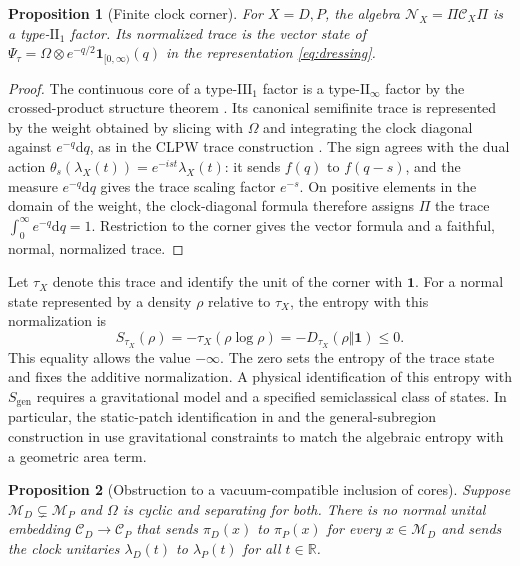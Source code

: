 \documentclass[11pt,a4paper]{article}
\numberwithin{equation}{section}
\newtheorem{proposition}{Proposition}[section]
\theoremstyle{remark}
\newcommand{\M}{\mathcal M}
\newcommand{\N}{\mathcal N}
\newcommand{\R}{\mathbb R}
\newcommand{\Core}{\mathcal C}
\newcommand{\dd}{\mathrm d}
\newcommand{\Sgen}{S_{\mathrm{gen}}}
\newcommand{\one}{\mathbf 1}
\begin{document}
\begin{proposition}[Finite clock corner]
\label{prop:corner}
For $X=D,P$, the algebra $\N_X=\Pi\Core_X\Pi$ is a type-$\mathrm{II}_1$ factor. Its normalized trace is the vector state of
$\Psi_\tau=\Omega\otimes e^{-q/2}\one_{[0,\infty)}(q)$ in the representation \eqref{eq:dressing}.
\end{proposition}

\begin{proof}
The continuous core of a type-$\mathrm{III}_1$ factor is a type-$\mathrm{II}_\infty$ factor by the crossed-product structure theorem \cite{Takesaki2003}. Its canonical semifinite trace is represented by the weight obtained by slicing with $\Omega$ and integrating the clock diagonal against $e^{-q}\dd q$, as in the CLPW trace construction \cite[Sec.~2.4]{CLPW2022}. The sign agrees with the dual action $\theta_s(\lambda_X(t))=e^{-ist}\lambda_X(t)$: it sends $f(q)$ to $f(q-s)$, and the measure $e^{-q}\dd q$ gives the trace scaling factor $e^{-s}$. On positive elements in the domain of the weight, the clock-diagonal formula therefore assigns $\Pi$ the trace $\int_0^\infty e^{-q}\dd q=1$. Restriction to the corner gives the vector formula and a faithful, normal, normalized trace.
\end{proof}

Let $\tau_X$ denote this trace and identify the unit of the corner with $\one$. For a normal state represented by a density $\rho$ relative to $\tau_X$, the entropy with this normalization is
\begin{equation}
 S_{\tau_X}(\rho)=-\tau_X(\rho\log\rho)
                  =-D_{\tau_X}(\rho\Vert\one)\leq0.
 \label{eq:trace-entropy}
\end{equation}
This equality allows the value $-\infty$. The zero sets the entropy of the trace state and fixes the additive normalization. A physical identification of this entropy with $\Sgen$ requires a gravitational model and a specified semiclassical class of states. In particular, the static-patch identification in \cite{CLPW2022} and the general-subregion construction in \cite{Jensen2023} use gravitational constraints to match the algebraic entropy with a geometric area term.

\begin{proposition}[Obstruction to a vacuum-compatible inclusion of cores]
\label{prop:obstruction}
Suppose $\M_D\subsetneq\M_P$ and $\Omega$ is cyclic and separating for both. There is no normal unital embedding $\Core_D\to\Core_P$ that sends $\pi_D(x)$ to $\pi_P(x)$ for every $x\in\M_D$ and sends the clock unitaries $\lambda_D(t)$ to $\lambda_P(t)$ for all $t\in\R$.
\end{proposition}
\end{document}
